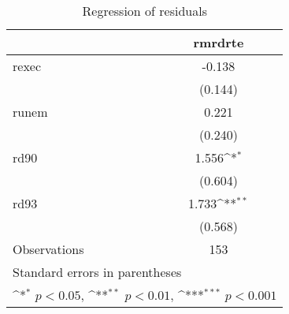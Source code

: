 \begin{table}[htbp]\centering
\def\sym#1{\ifmmode^{#1}\else\(^{#1}\)\fi}
\caption{Regression of residuals}
\begin{tabular}{l*{1}{c}}
\hline\hline
                    &\multicolumn{1}{c}{rmrdrte}\\
\hline
rexec               &      -0.138         \\
                    &     (0.144)         \\
[1em]
runem               &       0.221         \\
                    &     (0.240)         \\
[1em]
rd90                &       1.556\sym{*}  \\
                    &     (0.604)         \\
[1em]
rd93                &       1.733\sym{**} \\
                    &     (0.568)         \\
\hline
Observations        &         153         \\
\hline\hline
\multicolumn{2}{l}{\footnotesize Standard errors in parentheses}\\
\multicolumn{2}{l}{\footnotesize \sym{*} \(p<0.05\), \sym{**} \(p<0.01\), \sym{***} \(p<0.001\)}\\
\end{tabular}
\end{table}
